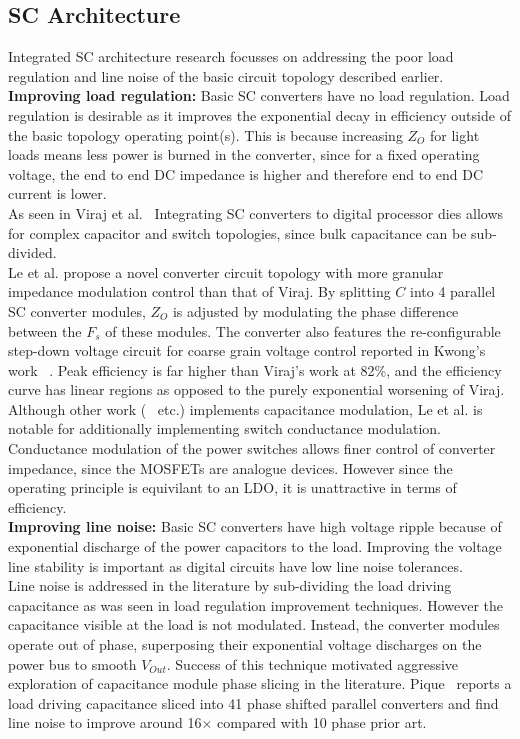 \documentclass[letterpaper,twocolumn,10pt]{article}
\begin{document}
\subsection{SC Architecture}
Integrated SC architecture research focusses on addressing the poor load regulation and line noise of the basic circuit topology described earlier.\\
\textbf{Improving load regulation: }Basic SC converters have no load regulation. Load regulation is desirable as it improves the exponential decay in efficiency outside of the basic topology operating point(s). This is because increasing $Z_O$ for light loads means less power is burned in the converter, since for a fixed operating voltage, the end to end DC impedance is higher and therefore end to end DC current is lower.\\
\indent As seen in  Viraj et al.~\cite{Viraj2007} Integrating SC converters to digital processor dies allows for complex capacitor and switch topologies, since bulk capacitance can be sub-divided.\\
Le et al. \cite{Phuck2010} propose a novel converter circuit topology with more granular impedance modulation control than that of Viraj. By splitting $C$ into 4 parallel SC converter modules, $Z_O$ is adjusted by modulating the phase difference between the $F_s$ of these modules. The converter also features the re-configurable step-down voltage circuit for coarse grain voltage control reported in Kwong's work ~\cite{Kwong2009}. Peak efficiency is far higher than Viraj's work\cite{Viraj2007} at 82\%, and the efficiency curve has linear regions as opposed to the purely exponential worsening of Viraj.\\
Although other work (~\cite{Ramadass2010} etc.) implements capacitance modulation, Le et al. is notable for additionally implementing switch conductance modulation.\\
Conductance modulation of the power switches allows finer control of converter impedance, since the MOSFETs are analogue devices. However since the operating principle is equivilant to an LDO, it is unattractive in terms of efficiency.\\ 
\textbf{Improving line noise: }Basic SC converters have high voltage ripple because of exponential discharge of the power capacitors to the load. Improving the voltage line stability is important as digital circuits have low line noise tolerances.\\ 
Line noise is addressed in the literature by sub-dividing the load driving capacitance as was seen in load regulation improvement techniques. However the capacitance visible at the load is not modulated. Instead, the converter modules operate out of phase, superposing their exponential voltage discharges on the power bus to smooth $V_{Out}$. Success of this technique motivated aggressive exploration of capacitance module phase slicing in the literature. Pique~\cite{Pique2012} reports a load driving capacitance sliced into 41 phase shifted parallel converters and find line noise to improve around 16$\times$ compared with 10 phase prior art.\\ 
\end{document}
